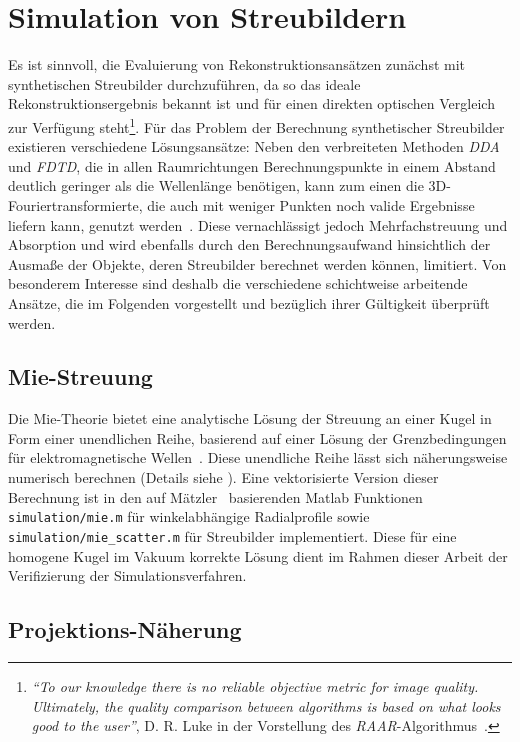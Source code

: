\chapter{Simulation von Streubildern}
Es ist sinnvoll, die Evaluierung von Rekonstruktionsansätzen zunächst mit synthetischen Streubilder durchzuführen, da so das ideale Rekonstruktionsergebnis bekannt ist und für einen direkten optischen Vergleich zur Verfügung steht\footnote{\textit{"`To our
	knowledge there is no reliable objective metric for image quality. Ultimately, the quality
	comparison between algorithms is based on what looks good to the user"'}, D. R. Luke in der Vorstellung des \textit{RAAR}-Algorithmus~\cite{luke2004}.}. 
Für das Problem der Berechnung synthetischer Streubilder existieren verschiedene Lösungsansätze: Neben den verbreiteten Methoden \textit{DDA} und \textit{FDTD}, die in allen Raumrichtungen Berechnungspunkte in einem Abstand deutlich geringer als die Wellenlänge benötigen, kann zum einen die 3D-Fouriertransformierte, die auch mit weniger Punkten noch valide Ergebnisse liefern kann, genutzt werden~\cite{kunz1993,sander2014,hantke2016}. Diese vernachlässigt jedoch Mehrfachstreuung und Absorption und wird ebenfalls durch den Berechnungsaufwand hinsichtlich der Ausmaße der Objekte, deren Streubilder berechnet werden können, limitiert. Von besonderem Interesse sind deshalb die verschiedene schichtweise arbeitende Ansätze, die im Folgenden vorgestellt und bezüglich ihrer Gültigkeit überprüft werden.

\section{Mie-Streuung}
Die Mie-Theorie bietet eine analytische Lösung der Streuung an einer Kugel in Form einer unendlichen Reihe, basierend auf einer Lösung der Grenzbedingungen für elektromagnetische Wellen~\cite{bohren1983}. Diese unendliche Reihe lässt sich näherungsweise numerisch berechnen (Details siehe ).
Eine vektorisierte Version dieser Berechnung ist in den auf Mätzler~\cite{maetzler2002} basierenden Matlab Funktionen \texttt{simulation/mie.m} für winkelabhängige Radialprofile sowie \texttt{simulation/mie\_scatter.m} für Streubilder implementiert. Diese für eine homogene Kugel im Vakuum korrekte Lösung dient im Rahmen dieser Arbeit der Verifizierung der Simulationsverfahren.

\section{Projektions-Näherung}
	
